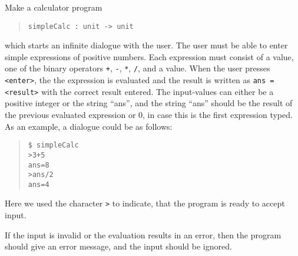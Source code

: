 Make a calculator program
\begin{quote}
  \mbox{\lstinline!simpleCalc : unit -> unit!}
\end{quote}
which starts an infinite dialogue with the user. The user must be able to enter
simple expressions of positive numbers. Each expression must consist
of a value, one of the binary operators \lstinline!+!, \lstinline!-!,
\lstinline!*!, \lstinline!/!, and a value. When the user presses
\lstinline[language=console]!<enter>!, the the expression is evaluated
and the result is written as \lstinline[language=console]{ans = <result>} with the correct result entered. The input-values can either
be a positive integer or the string ``ans'', and the string ``ans''
should be the result of the previous evaluated expression or 0, in
case this is the first expression typed. As an example, a dialogue
could be as follows:
\begin{quote}
  \mbox{\lstinline!$ simpleCalc!}\\ %
  \mbox{\lstinline!>3+5!}\\
  \mbox{\lstinline!ans=8!}\\
  \mbox{\lstinline!>ans/2!}\\
  \mbox{\lstinline!ans=4!}\\
\end{quote}
Here we used the character \lstinline{>} to indicate, that the program
is ready to accept input.

If the input is invalid or the evaluation results in an error, then
the program should give an error message, and the input should be
ignored.

